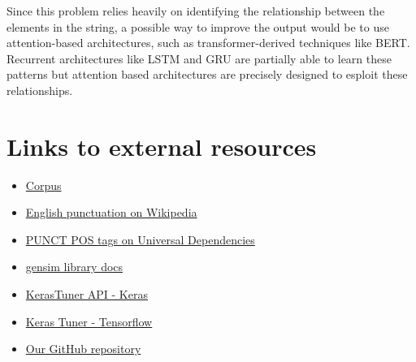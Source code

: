 \documentclass[11pt]{article}
\begin{document}
Since this problem relies heavily on identifying the relationship between the elements in the string, a possible way to improve the output would be to use attention-based architectures, such as transformer-derived techniques like BERT. Recurrent architectures like LSTM and GRU are partially able to learn these patterns but attention based architectures are precisely designed to esploit these relationships.

\section{Links to external resources}
\label{sec:links}

\begin{itemize}
    \item \href{https://raw.githubusercontent.com/nltk/nltk_data/gh-pages/packages/corpora/dependency_treebank.zip}{Corpus}
    \item \href{https://en.wikipedia.org/wiki/English_punctuation}{English punctuation on Wikipedia}
    \item \href{https://universaldependencies.org/docs/en/pos/all.html#al-en-pos/PUNCT}{PUNCT POS tags on Universal Dependencies}
    \item \href{https://radimrehurek.com/gensim/auto_examples/index.html}{gensim library docs}
    \item \href{https://keras.io/api/keras_tuner/}{KerasTuner API - Keras}
    \item \href{https://www.tensorflow.org/tutorials/keras/keras_tuner}{Keras Tuner - Tensorflow}
    \item \href{https://github.com/Danysan1/ai-unibo-nlp-project}{Our GitHub repository}
\end{itemize}



%


\end{document}
